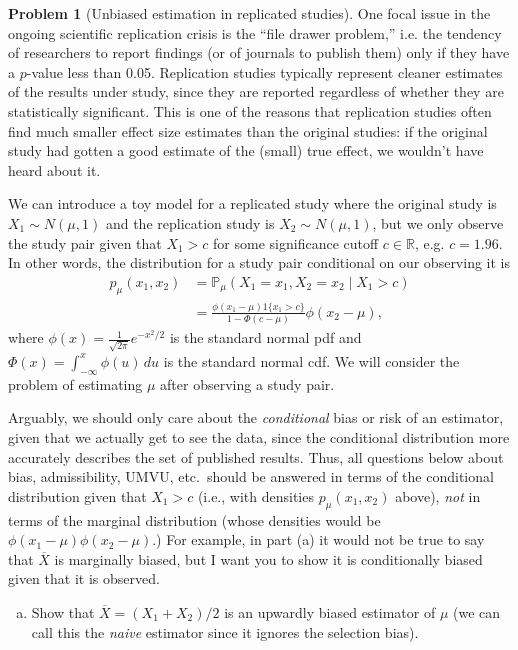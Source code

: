 \documentclass{article}
\newcommand{\PP}{\mathbb{P}}
\newcommand{\RR}{\mathbb{R}}
\theoremstyle{definition}
\newtheorem{problem}{Problem}
\begin{document}
\begin{problem}[Unbiased estimation in replicated studies]

One focal issue in the ongoing scientific replication crisis is the ``file drawer problem,'' i.e. the tendency of researchers to report findings (or of journals to publish them) only if they have a $p$-value less than 0.05. Replication studies typically represent cleaner estimates of the results under study, since they are reported regardless of whether they are statistically significant. This is one of the reasons that replication studies often find much smaller effect size estimates than the original studies: if the original study had gotten a good estimate of the (small) true effect, we wouldn't have heard about it.

We can introduce a toy model for a replicated study where the original study is $X_1 \sim N(\mu, 1)$ and the replication study is $X_2 \sim N(\mu, 1)$, but we only observe the study pair given that $X_1 > c$ for some significance cutoff $c \in \RR$, e.g. $c=1.96$. In other words, the distribution for a study pair conditional on our observing it is
\begin{align*}
p_\mu(x_1,x_2) &= \PP_\mu(X_1=x_1,X_2=x_2 \mid X_1 > c)\\
  &= \frac{\phi(x_1-\mu)1\{x_1 > c\}}{1-\Phi(c-\mu)} \phi(x_2-\mu),
\end{align*}
where $ \phi(x) = \frac{1}{\sqrt{2\pi}}e^{-x^2/2}$ is the standard normal pdf and $\Phi(x) =  \int_{-\infty}^x \phi(u)\,d  u$ is the standard normal cdf. We will consider the problem of estimating $\mu$ after observing a study pair.

Arguably, we should only care about the {\em conditional} bias or risk of an estimator, given that we actually get to see the data, since the conditional distribution more accurately describes the set of published results. Thus, all questions below about bias, admissibility, UMVU, etc.\, should be answered in terms of the conditional distribution given that $X_1>c$ (i.e., with densities $p_{\mu}(x_1,x_2)$ above), {\em not} in terms of the marginal distribution (whose densities would be $\phi(x_1-\mu)\phi(x_2-\mu)$.) For example, in part (a) it would not be true to say that $\overline X$ is marginally biased, but I want you to show it is conditionally biased given that it is observed.

\begin{enumerate}[(a)]
\item Show that $\overline X = (X_1 + X_2)/2$ is an upwardly biased estimator of $\mu$ (we can call this the {\em naive} estimator since it ignores the selection bias).




\end{enumerate}
\end{problem}
\end{document}
